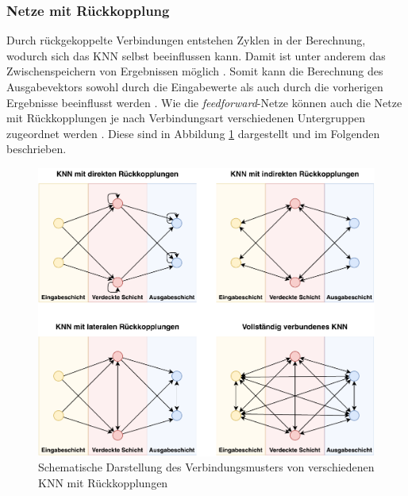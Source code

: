 \subsubsection{Netze mit Rückkopplung}
Durch rückgekoppelte Verbindungen entstehen Zyklen in der Berechnung, wodurch sich das \ac{KNN} selbst beeinflussen kann. Damit ist unter anderem das Zwischenspeichern von Ergebnissen möglich \cite{russell2013kunstliche}. Somit kann die Berechnung des Ausgabevektors sowohl durch die Eingabewerte als auch durch die vorherigen Ergebnisse beeinflusst werden \cite{lin1998embedded}. Wie die \emph{feedforward}-Netze können auch die Netze mit Rückkopplungen je nach Verbindungsart verschiedenen Untergruppen zugeordnet werden \cite{zell2003simulation}. Diese sind in Abbildung \ref{fig:recurrent_network_structures} dargestellt und im Folgenden beschrieben.
\begin{figure}[h]
	\centering
	\includegraphics[width=1.0\textwidth]{./img/neural_network_basics/recurrent_networks.pdf} 
	\caption{Schematische Darstellung des Verbindungsmusters von verschiedenen KNN mit Rückkopplungen}
	\label{fig:recurrent_network_structures}
\end{figure}
